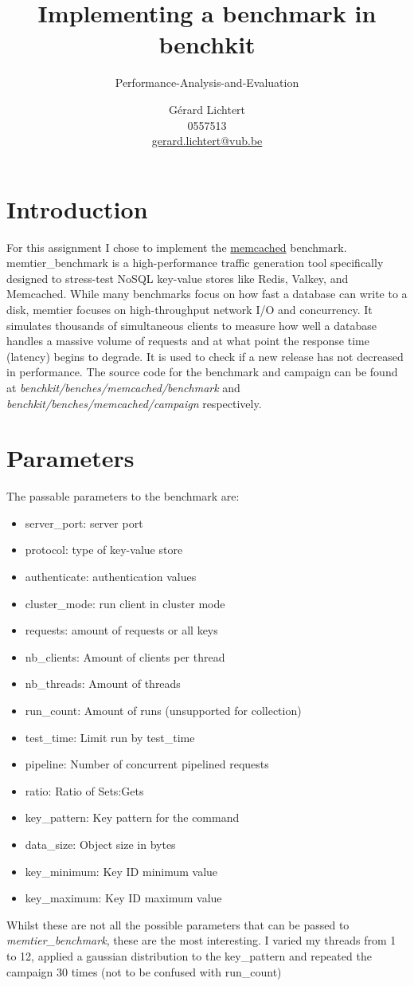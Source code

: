 \documentclass[a4paper]{article}
\title{Implementing a benchmark in benchkit}
\subtitle{Performance-Analysis-and-Evaluation}
\author{Gérard Lichtert\\
        0557513\\
    \href{mailto:gerard.lichtert@vub.be}{gerard.lichtert@vub.be}
}
\begin{document}
\maketitle

\tableofcontents
\newpage
\section{Introduction}
For this assignment I chose to implement the \href{https://github.com/redis/memtier_benchmark}{memcached} benchmark.
memtier\_benchmark is a high-performance traffic generation tool specifically designed to stress-test NoSQL key-value stores like Redis, Valkey, and Memcached.
While many benchmarks focus on how fast a database can write to a disk, memtier
focuses on high-throughput network I/O and concurrency. It simulates thousands
of simultaneous clients to measure how well a database handles a massive volume
of requests and at what point the response time (latency) begins to degrade. It
is used to check if a new release has not decreased in performance.
The source code for the benchmark and campaign can be found at
\textit{benchkit/benches/memcached/benchmark} and
\textit{benchkit/benches/memcached/campaign} respectively.
\section{Parameters}
The passable parameters to the benchmark are:
\begin{itemize}
	\item server\_port: server port
	\item protocol: type of key-value store
	\item authenticate: authentication values
	\item cluster\_mode: run client in cluster mode
	\item requests: amount of requests or all keys
	\item nb\_clients: Amount of clients per thread
	\item nb\_threads: Amount of threads
	\item run\_count: Amount of runs (unsupported for collection)
	\item test\_time: Limit run by test\_time
	\item pipeline: Number of concurrent pipelined requests
	\item ratio: Ratio of Sets:Gets
	\item key\_pattern: Key pattern for the command
	\item data\_size: Object size in bytes
	\item key\_minimum: Key ID minimum value
	\item key\_maximum: Key ID maximum value
\end{itemize}
Whilst these are not all the possible parameters that can be passed to
\textit{memtier\_benchmark}, these are the most interesting.
I varied my threads from 1 to 12, applied a gaussian distribution to the
key\_pattern and repeated the campaign 30 times (not to be confused with
run\_count)
\end{document}
